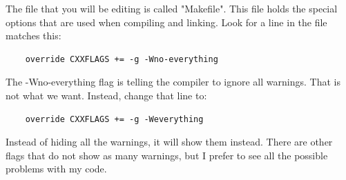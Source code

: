 The file that you will be editing is called "Makefile". This file holds the special options that are used when compiling and linking. Look for a line in the file matches this:

\begin{verbatim}
    override CXXFLAGS += -g -Wno-everything    
\end{verbatim}

The -Wno-everything flag is telling the compiler to ignore all warnings. That is not what we want. Instead, change that line to:

\begin{verbatim}
    override CXXFLAGS += -g -Weverything
\end{verbatim}

Instead of hiding all the warnings, it will show them instead. There are other flags that do not show as many warnings, but I prefer to see all the possible problems with my code.

